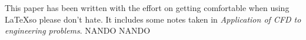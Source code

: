 This paper has been written with the effort on getting comfortable when using \LaTeX  so please don't hate. It includes some notes taken in \textit{Application of CFD to engineering problems}. NANDO NANDO